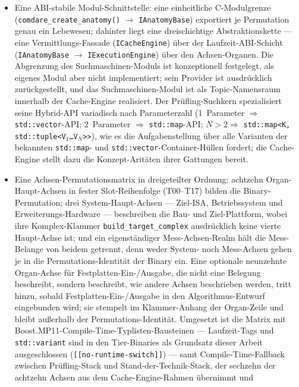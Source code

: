 \begin{itemize}
  \item Eine ABI-stabile Modul-Schnittstelle: eine einheitliche C-Modulgrenze
  (\texttt{comdare\_\allowbreak{}create\_anatomy()} $\to$ \texttt{IAnatomyBase}) exportiert je
  Permutation genau ein Lebewesen; dahinter liegt eine dreischichtige Abstraktionskette --- eine
  Vermittlungs-Fassade (\texttt{ICacheEngine}) über der Laufzeit-ABI-Schicht
  (\texttt{IAnatomyBase} $\to$ \texttt{IExecutionEngine}) über den Achsen-Organen. Die Abgrenzung des
  Suchmaschinen-Moduls ist konzeptionell festgelegt, als eigenes Modul aber nicht implementiert; sein
  Provider ist ausdrücklich zurückgestellt, und das Suchmaschinen-Modul ist als
  Topic-Namensraum innerhalb der Cache-Engine realisiert. Der Prüfling-Suchkern spezialisiert seine Hybrid-API variadisch nach
  Parameterzahl (1~Parameter $\Rightarrow$ \texttt{std::vector}-API\@;
  2~Parameter $\Rightarrow$ \texttt{std::map}-API\@; $N>2 \Rightarrow$
  \texttt{std::map<K,\,std::tuple<V$_1$\ldots V$_N$>>}), wie es die Aufgabenstellung über alle Varianten
  der bekannten \texttt{std::map}- und \texttt{std::vector}-Container-Hüllen fordert; die Cache-Engine
  stellt dazu die Konzept-Aritäten ihrer Gattungen bereit.
  \item Eine Achsen-Permutationsmatrix in dreigeteilter Ordnung: achtzehn Organ-Haupt-Achsen in fester
  Slot-Reihenfolge (T00--T17) bilden die Binary-Permutation; drei System-Haupt-Achsen --- Ziel-ISA,
  Betriebssystem und Erweiterungs-Hardware --- beschreiben die Bau- und Ziel-Plattform, wobei ihre
  Komplex-Klammer \texttt{build\_target\_complex} ausdrücklich keine vierte Haupt-Achse ist; und ein
  eigenständiger Mess-Achsen-Realm hält die Mess-Belange von beidem getrennt, denn weder System- noch
  Mess-Achsen gehen je in die Permutations-Identität der Binary ein. Eine optionale neunzehnte
  Organ-Achse für Festplatten-Ein-/Ausgabe, die nicht eine Belegung beschreibt, sondern beschreibt, wie andere
  Achsen beschrieben werden, tritt hinzu, sobald Festplatten-Ein-/Ausgabe in den Algorithmus-Entwurf eingebunden
  wird; sie stempelt im Klammer-Anhang der Organ-Zeile und bleibt außerhalb der
  Permutations-Identität. Umgesetzt ist die Matrix mit Boost.MP11-Compile-Time-Typlisten-Bausteinen ---
  Laufzeit-Tags und \texttt{std::variant} sind in den Tier-Binaries als Grundsatz dieser Arbeit ausgeschlossen
  (\texttt{[[no-runtime-switch]]}) --- samt Compile-Time-Fallback zwischen Prüfling-Stack und
  Stand-der-Technik-Stack, der sechzehn der achtzehn Achsen aus dem Cache-Engine-Rahmen übernimmt und

\end{itemize}
